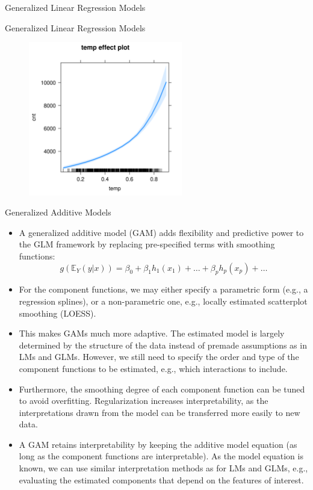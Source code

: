 \documentclass[11pt,compress,t,notes=noshow, xcolor=table]{beamer}
\begin{document}
\begin{vbframe}{Generalized Linear Regression Models}
\tiny

\end{vbframe}

\begin{vbframe}{Generalized Linear Regression Models}
\begin{figure}
  \includegraphics[width = 0.6\textwidth]{figure/glm_effect_plot.png}
\end{figure}
\end{vbframe}

\begin{vbframe}{Generalized Additive Models}
\begin{itemize}
\setlength\itemsep{2em}
\item A generalized additive model (GAM) adds flexibility and predictive power to the GLM framework by replacing pre-specified terms with smoothing functions:
$$
g\left(\mathbb{E}_Y(y \vert x)\right) = \beta_0 + \beta_1 h_1(x_1) + \dots + \beta_p h_p(x_p) + \dots
$$
\item For the component functions, we may either specify a parametric form (e.g., a regression splines), or a non-parametric one, e.g., locally estimated scatterplot smoothing (LOESS).
\item This makes GAMs much more adaptive. The estimated model is largely determined by the structure of the data instead of premade assumptions as in LMs and GLMs. However, we still need to specify the order and type of the component functions to be estimated, e.g., which interactions to include.
\item Furthermore, the smoothing degree of each component function can be tuned to avoid overfitting. Regularization increases interpretability, as the interpretations drawn from the model can be transferred more easily to new data.
\item A GAM retains interpretability by keeping the additive model equation (as long as the component functions are interpretable). As the model equation is known, we can use similar interpretation methods as for LMs and GLMs, e.g., evaluating the estimated components that depend on the features of interest.
\end{itemize}
\end{vbframe}
\end{document}
